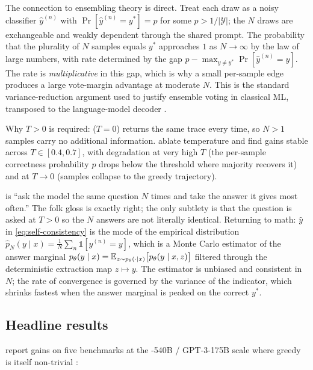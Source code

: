 The connection to ensembling theory is direct. Treat each draw as a
noisy classifier $\hat y^{(n)}$ with $\Pr[\hat y^{(n)} = y^*] = p$ for
some $p > 1/|\mathcal{Y}|$; the $N$ draws are exchangeable and weakly
dependent through the shared prompt. The probability that the
plurality of $N$ samples equals $y^*$ approaches $1$ as $N \to \infty$
by the law of large numbers, with rate determined by the gap
$p - \max_{y \ne y^*} \Pr[\hat y^{(n)} = y]$. The rate is
\emph{multiplicative} in this gap, which is why a small per-sample
edge produces a large vote-margin advantage at moderate $N$. This is
the standard variance-reduction argument used to justify ensemble
voting in classical ML, transposed to the language-model decoder
\citep[\S 3]{wang2022-self-consistency}.

Why $T > 0$ is required:  ($T = 0$) returns the same
trace every time, so $N > 1$ samples carry no additional information.
\citet[\S 4.3]{wang2022-self-consistency} ablate temperature and find
gains stable across $T \in [0.4, 0.7]$, with degradation at very high
$T$ (the per-sample correctness probability $p$ drops below the
threshold where majority recovers it) and at $T \to 0$ (samples
collapse to the greedy trajectory).

\begin{intuition}
 is ``ask the model the same question $N$ times and
take the answer it gives most often.'' The folk gloss is exactly right;
the only subtlety is that the question is asked at $T > 0$ so the $N$
answers are not literally identical. Returning to math: $\hat y$ in
\cref{eq:self-consistency} is the mode of the empirical distribution
$\hat p_N(y \mid x) = \frac{1}{N}\sum_n \mathbb{1}[y^{(n)} = y]$, which
is a Monte Carlo estimator of the answer marginal
$p_\theta(y \mid x) = \operatorname{\mathbb{E}}_{z \sim p_\theta(\cdot \mid x)}\bigl[
p_\theta(y \mid x, z)\bigr]$ filtered through the deterministic
extraction map $z \mapsto y$. The estimator is unbiased and consistent
in $N$; the rate of convergence is governed by the variance of the
indicator, which shrinks fastest when the answer marginal is peaked on
the correct $y^*$.
\end{intuition}

\subsection{Headline results}
\label{sec:sc-results}

\citet{wang2022-self-consistency} report gains on five benchmarks at the
-540B / GPT-3-175B scale where greedy  is itself
non-trivial \citep[abstract]{wang2022-self-consistency}:

